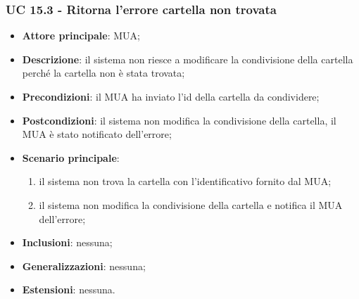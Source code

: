 \subsubsection{UC 15.3 - Ritorna l'errore cartella non trovata} \label{sec:UC15.3}
    \begin{itemize}
        \item \textbf{Attore principale}: MUA;
        \item \textbf{Descrizione}: il sistema non riesce a modificare la condivisione della cartella perché la cartella non è stata trovata;
        \item \textbf{Precondizioni}: il MUA ha inviato l'id della cartella da condividere;
        \item \textbf{Postcondizioni}: il sistema non modifica la condivisione della cartella, il MUA è stato notificato dell'errore;
        \item \textbf{Scenario principale}:
            \begin{enumerate}
                \item il sistema non trova la cartella con l'identificativo fornito dal MUA;
                \item il sistema non modifica la condivisione della cartella e notifica il MUA dell'errore;
            \end{enumerate}
        \item \textbf{Inclusioni}: nessuna;
        \item \textbf{Generalizzazioni}: nessuna;
        \item \textbf{Estensioni}: nessuna.
    \end{itemize}

